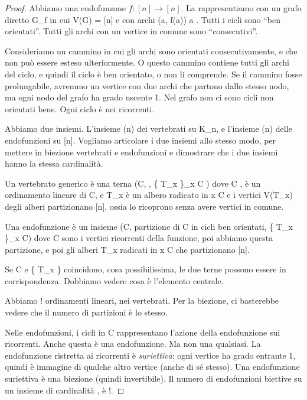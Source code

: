 \begin{proof}

Abbiamo una endofunzone $f : [n] \to [n]$.
La rappresentiamo con un grafo diretto G_f in cui V(G) = [n] e con archi (a, f(a)) \forall a \in [n].
Tutti i cicli sono ``ben orientati''.
Tutti gli archi con un vertice in comune sono ``consecutivi''.

Consideriamo un cammino in cui gli archi sono orientati consecutivamente, e che non pu\`o essere esteso ulteriormente.
O questo cammino contiene tutti gli archi del ciclo, e quindi il ciclo \`e ben orientato, o non li comprende.
Se il cammino fosse prolungabile, avremmo un vertice con due archi che partono dallo stesso nodo, ma ogni nodo del grafo ha grado uscente 1.
Nel grafo non ci sono cicli non orientati bene.
Ogni ciclo \`e nei ricorrenti.

Abbiamo due insiemi.
L'insieme (n) dei vertebrati su K_n, e l'insieme (n) delle endofunzioni su [n].
Vogliamo articolare i due insiemi allo stesso modo, per mettere in biezione vertebrati e endofunzioni e dimostrare che i due insiemi hanno
la stessa cardinalit\`a.

Un vertebrato generico \`e una terna (C, , \{ T_x \}_{x \in C} ) dove C \subseteq [n],  \`e un ordinamento lineare di C, e T_x \`e un albero radicato in x \in C e i vertici V(T_x) degli alberi partizionano [n], ossia lo ricoprono senza avere vertici in comune.

Una endofunzione \`e un insieme (C, partizione di C in cicli ben orientati, \{ T_x \}_{x \in C}) dove C \subseteq [n] sono i vertici ricorrenti della funzione, poi abbiamo questa partizione, e poi gli alberi T_x radicati in x \in C che partizionano [n].

Se C e \{ T_x \} coincidono, cosa possibilissima, le due terne possono essere in corrispondenza.
Dobbiamo vedere cosa \`e l'elemento centrale.

Abbiamo ! ordinamenti lineari, nei vertebrati.
Per la biezione, ci basterebbe vedere che il numero di partizioni \`e lo stesso.

Nelle endofunzioni, i cicli in C rappresentano l'azione della endofunzione sui ricorrenti.
Anche questa \`e una endofunzione.
Ma non una qualsiasi.
La endofunzione ristretta ai ricorrenti \`e \emph{suriettiva}: ogni vertice ha grado entrante 1, quindi \`e immagine di qualche altro vertice (anche di s\'e stesso).
Una endofunzione suriettiva \`e una biezione (quindi invertibile).
Il numero di endofunzioni biettive su un insieme di cardinalit\`a , \`e !.


\end{proof}
